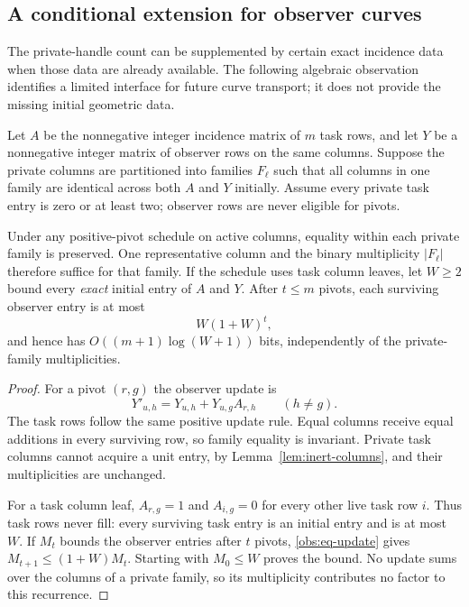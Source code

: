 \subsection{A conditional extension for observer curves}
\label{sec:observer-families}

The private-handle count can be supplemented by certain exact incidence
data when those data are already available.  The following algebraic
observation identifies a limited interface for future curve transport;
it does not provide the missing initial geometric data.

\begin{lemma}
\label{obs:lem-families}
Let $A$ be the nonnegative integer incidence matrix of $m$ task rows,
and let $Y$ be a nonnegative integer matrix of observer rows on the
same columns.  Suppose the private columns are partitioned into
families $F_\ell$ such that all columns in one family are identical
across both $A$ and $Y$ initially.  Assume every private task entry
is zero or at least two; observer rows are never eligible for pivots.

Under any positive-pivot schedule on active columns, equality within
each private family is preserved.  One representative column and
the binary multiplicity $|F_\ell|$ therefore suffice for that family.
If the schedule uses task column leaves, let $W\geq2$ bound every
\emph{exact} initial entry of $A$ and $Y$.  After $t\leq m$ pivots,
each surviving observer entry is at most
\[
 W(1+W)^t,
\]
and hence has $O((m+1)\log(W+1))$ bits, independently of the
private-family multiplicities.
\end{lemma}

\begin{proof}
For a pivot $(r,g)$ the observer update is
\begin{equation}
 Y'_{u,h}=Y_{u,h}+Y_{u,g}A_{r,h}\qquad(h\ne g).
 \label{obs:eq-update}
\end{equation}
The task rows follow the same positive update rule.  Equal columns
receive equal additions in every surviving row, so family equality
is invariant.  Private task columns cannot acquire a unit entry,
by Lemma~\ref{lem:inert-columns}, and their multiplicities are unchanged.

For a task column leaf, $A_{r,g}=1$ and $A_{i,g}=0$ for every other
live task row $i$.  Thus task rows never fill: every surviving task
entry is an initial entry and is at most $W$.  If $M_t$ bounds the
observer entries after $t$ pivots, \eqref{obs:eq-update} gives
$M_{t+1}\leq(1+W)M_t$.  Starting with $M_0\leq W$ proves the bound.
No update sums over the columns of a private family, so its
multiplicity contributes no factor to this recurrence.
\end{proof}

